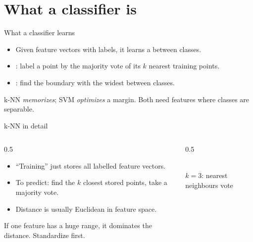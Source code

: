 \documentclass[10pt,aspectratio=169]{beamer}
\begin{document}
\section{What a classifier is}

\begin{frame}{What a classifier learns}
  \begin{itemize}
    \item Given feature vectors with labels, it learns a  between classes.
    \item {}: label a point by the majority vote of its $k$ nearest training points.
    \item {}: find the boundary with the widest  between classes.
  \end{itemize}
  \begin{mathbox}
    k-NN \emph{memorizes}; SVM \emph{optimizes} a margin. Both need features where classes are separable.
  \end{mathbox}
\end{frame}

\begin{frame}{k-NN in detail}
  \begin{columns}[T]
    \begin{column}{0.5\textwidth}
      \begin{itemize}
        \item ``Training'' just stores all labelled feature vectors.
        \item To predict: find the $k$ closest stored points, take a majority vote.
        \item Distance is usually Euclidean in feature space.
      \end{itemize}
      \begin{badbox}
        If one feature has a huge range, it dominates the distance. Standardize first.
      \end{badbox}
    \end{column}
    \begin{column}{0.5\textwidth}
      \begin{center}
      \\
      {\scriptsize $k{=}3$: nearest neighbours vote}
      \end{center}
    \end{column}
  \end{columns}
\end{frame}
\end{document}
